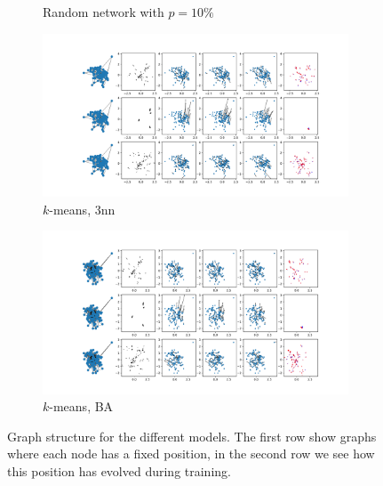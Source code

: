 \documentclass[a4paper,10pt]{article}
\begin{document}
\begin{figure}[htbp]
\begin{subfigure}{0.24\textwidth}
    \caption{Random network with $p=10\%$}
  \end{subfigure}
  \begin{subfigure}{0.24\textwidth}
    \centering
    \includegraphics[trim={0 13.2cm 29cm 0},clip,width=\textwidth]{../results/nn-100N-noemb0}
    \caption{$k$-means, 3nn}
  \end{subfigure}
  \begin{subfigure}{0.24\textwidth}
    \centering
    \includegraphics[trim={0 13.2cm 29cm 0},clip,width=\textwidth]{../results/ba-100N-noemb0}
    \caption{$k$-means, BA}
  \end{subfigure}
  \caption{Graph structure for the different models. The first row show graphs where each node has a fixed position, in the second row we see how this position has evolved during training.}
  \label{fig:graphs}
\end{figure}
\end{document}
